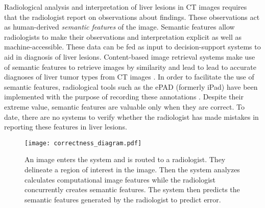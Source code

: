 Radiological analysis and interpretation of liver lesions in CT images requires that the radiologist report on observations about findings.
These observations act as human-derived \emph{semantic features} of the image.
Semantic features allow radiologists to make their observations and interpretation explicit as well as machine-accessible.
These data can be fed as input to decision-support systems to aid in diagnosis of liver lesions.
Content-based image retrieval systems make use of semantic features to retrieve images by similarity \cite{Napel:2010vb} and lead to lead to accurate diagnoses of liver tumor types from CT images \cite{Korenblum:2011gx}.
In order to facilitate the use of semantic features, radiological tools such as the ePAD (formerly iPad) have been implemented with the purpose of recording these annotations \cite{Rubin:2008uz}.
Despite their extreme value, semantic features are valuable only when they are correct.
To date, there are no systems to verify whether the radiologist has made mistakes in reporting these features in liver lesions.


\begin{figure}[h]
	\centering
	\texttt{[image: correctness\_diagram.pdf]}
	\caption[Overview of the the annotation verification system]{An image enters the system and is routed to a radiologist. They delineate a region of interest in the image. Then the system analyzes calculates computational image features while the radiologist concurrently creates semantic features. The system then predicts the semantic features generated by the radiologist to predict error.}
	\label{fig:correctness_diagram}
\end{figure}

